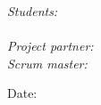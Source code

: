 \begin{titlepage}
\begin{flushleft} \large
\textit{Students:}\\
\reportauthor \\%
\vspace{1cm}
\textit{Project partner:}
\projectpartner\\ %
\vspace{1cm}
\textit{Scrum master:} \\ %
\scrummaster
\end{flushleft}
\vspace{1cm}
\makeatletter
Date: \@date 

\vfill %



\makeatother


\end{titlepage}

